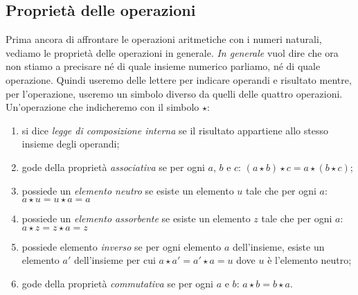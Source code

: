 \subsection{Proprietà delle operazioni}

Prima ancora di affrontare le operazioni aritmetiche con i numeri naturali, 
vediamo le proprietà delle operazioni in generale. \emph{In generale} vuol 
dire che ora non stiamo a precisare né di quale insieme numerico parliamo, 
né di quale operazione. Quindi useremo delle lettere per indicare  
operandi e  risultato mentre, per l'operazione, useremo un simbolo diverso 
da quelli delle quattro operazioni. Un'operazione che indicheremo con il 
simbolo \(\star\):

\begin{enumerate} [noitemsep]
\item si dice \emph{legge di composizione interna}  se
il risultato appartiene allo stesso insieme degli operandi;
\item gode della proprietà \emph{associativa} 
se per ogni \(a\), \(b\) e \(c\): 
\((a \star b) \star c = a \star (b \star c)\);
\item possiede un \emph{elemento neutro} 
se esiste un elemento \(u\) 
tale che per ogni \(a\): \(a \star u = u \star a = a\)
\item possiede un \emph{elemento assorbente} se esiste un elemento \(z\) 
tale che per ogni \(a\): \(a \star z = z \star a = z\)
\item possiede elemento \emph{inverso} 
se per ogni elemento \(a\) dell'insieme, esiste un elemento \(a'\) 
dell'insieme per cui \(a \star a' = a' \star a = u\) dove \(u\) è 
l'elemento neutro;
\item gode della proprietà \emph{commutativa} 
se per ogni \(a\) e \(b\): \(a \star b = b \star a\).
\end{enumerate}

